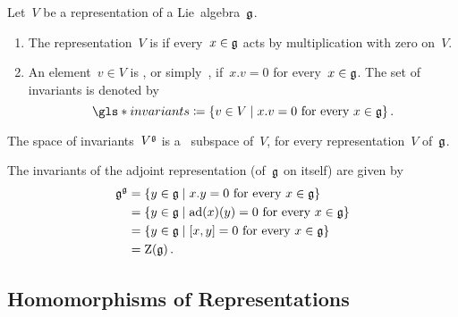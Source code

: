\begin{definition}
  \label{trivial representations}
  Let~$V$ be a representation of a Lie~algebra~$\mathfrak{g}$.
  \begin{enumerate}
    \item
      The representation~$V$ is  if every~$x \in \mathfrak{g}$ acts by multiplication with zero on~$V$.
    \item
      An element~$v \in V$ is , or simply~, if~$x.v = 0$ for every~$x \in \mathfrak{g}$.
      The set of invariants is denoted by
      \[
        \gls*{invariants}
        \defined
        \{
          v \in V
        \suchthat
          \text{$x.v = 0$ for every~$x \in \glie$}
        \}  \,.
      \]
  \end{enumerate}  
\end{definition}




\begin{lemma}
  The space of invariants~$V^{\mathfrak{g}}$ is a~{\linear{$\kf$}} subspace of~$V$, for every representation~$V$ of~$\mathfrak{g}$.
\end{lemma}


\begin{example}
  The invariants of the adjoint representation (of~$\mathfrak{g}$ on itself) are given by
  \begin{align*}
    \glie^\glie
    &=
    \{
      y \in \glie
    \suchthat
      \text{$x.y = 0$ for every~$x \in \glie$}
    \}
    \\
    &=
    \{
      y \in \glie
    \suchthat
      \text{$\ad(x)(y) = 0$ for every~$x \in \glie$}
    \}
    \\
    &=
    \{
      y \in \glie
    \suchthat
      \text{$[x,y] = 0$ for every~$x \in \glie$}
    \}
    \\
    &=
    \centerlie(\glie) \,.
  \end{align*}
\end{example}





\subsection{Homomorphisms of Representations}


